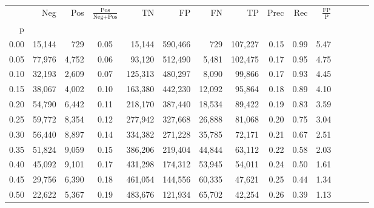 \begin{tabular}{rrrcrrrrrrrrrrr}
\toprule
{} &     Neg &    Pos & $\frac{\text{Pos}}{\text{Neg}+\text{Pos}}$ &       TN &       FP &       FN &       TP &  Prec &   Rec & $\frac{\text{FP}}{\text{P}}$ \\
p    &         &        &                                            &          &          &          &          &       &       &                              \\
\midrule
0.00 &  15,144 &    729 &                                       0.05 &   15,144 &  590,466 &      729 &  107,227 &  0.15 &  0.99 &                         5.47 \\
0.05 &  77,976 &  4,752 &                                       0.06 &   93,120 &  512,490 &    5,481 &  102,475 &  0.17 &  0.95 &                         4.75 \\
0.10 &  32,193 &  2,609 &                                       0.07 &  125,313 &  480,297 &    8,090 &   99,866 &  0.17 &  0.93 &                         4.45 \\
0.15 &  38,067 &  4,002 &                                       0.10 &  163,380 &  442,230 &   12,092 &   95,864 &  0.18 &  0.89 &                         4.10 \\
0.20 &  54,790 &  6,442 &                                       0.11 &  218,170 &  387,440 &   18,534 &   89,422 &  0.19 &  0.83 &                         3.59 \\
0.25 &  59,772 &  8,354 &                                       0.12 &  277,942 &  327,668 &   26,888 &   81,068 &  0.20 &  0.75 &                         3.04 \\
0.30 &  56,440 &  8,897 &                                       0.14 &  334,382 &  271,228 &   35,785 &   72,171 &  0.21 &  0.67 &                         2.51 \\
0.35 &  51,824 &  9,059 &                                       0.15 &  386,206 &  219,404 &   44,844 &   63,112 &  0.22 &  0.58 &                         2.03 \\
0.40 &  45,092 &  9,101 &                                       0.17 &  431,298 &  174,312 &   53,945 &   54,011 &  0.24 &  0.50 &                         1.61 \\
0.45 &  29,756 &  6,390 &                                       0.18 &  461,054 &  144,556 &   60,335 &   47,621 &  0.25 &  0.44 &                         1.34 \\
0.50 &  22,622 &  5,367 &                                       0.19 &  483,676 &  121,934 &   65,702 &   42,254 &  0.26 &  0.39 &                         1.13 \\

\end{tabular}
